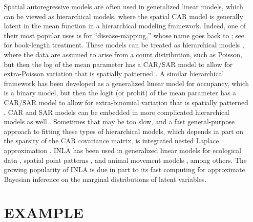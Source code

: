 \documentclass[11pt, titlepage]{article}\usepackage[]{graphicx}\usepackage[]{color}
\begin{document}
\begin{spacing}{1.9}
\begin{flushleft}
Spatial autoregressive models are often used in generalized linear models, which can be viewed as hierarchical models, where the spatial CAR model is generally latent in the mean function in a hierarchical modeling framework. Indeed, one of their most popular uses is for ``disease-mapping,'' whose name goes back to \citet{Clay:Kald:empi:1987}; see \citet{Laws:Baye:2009} for book-length treatment.  These models can be treated as hierarchical models \citep{Cres:Cald:Clar:VerH:acco:2009}, where the data are assumed to arise from a count distribution, such as Poisson, but then the log of the mean parameter has a CAR/SAR model to allow for extra-Poisson variation that is spatially patterned \citep[e.g.,][]{Ver:Jans:spac:2007}.  A similar hierarchical framework has been developed as a generalized linear model for occupancy, which is a binary model, but then the logit (or probit) of the mean parameter has a CAR/SAR model to allow for extra-binomial variation that is spatially patterned \citep{Mago:Ray:John:Valk:Daws:Bowm:mode:2007,Gard:Lawl:Ver:Mago:Kell:coar:2010,John:Conn:Hoot:Ray:Pond:spat:2013,Brom:John:Altw:Conq:spat:2014,Pole:Pond:Scha:Brow:Ray:John:occu:2014}.  CAR and SAR models can be embedded in more complicated hierarchical models as well \citep[e.g.,][]{Ver:Came:Bove:Lond:spat:2014}. Sometimes that may be too slow, and a fast general-purpose approach to fitting these types of hierarchical models, which depends in part on the sparsity of the CAR covariance matrix, is integrated nested Laplace approximation \citep[INLA,][]{Rue:Mart:Chop:appr:2009}. INLA has been used in generalized linear models for ecological data \citep[e.g.,][]{Haas:Hoot:Rizz:Meen:fore:2011,Aart:Fieb:Bras:Matt:quan:2013}, spatial point patterns \citep{Illi:Mart:Sorb:Gall:Zunz:Esqu:Trav:fitt:2013}, and animal movement models \citep{John:Hoot:Kuhn:esti:2013}, among others. The growing popularity of INLA is due in part to its fast computing for approximate Bayesian inference on the marginal distributions of latent variables.


\section*{EXAMPLE}




\end{flushleft}
\end{spacing}
\end{document}

